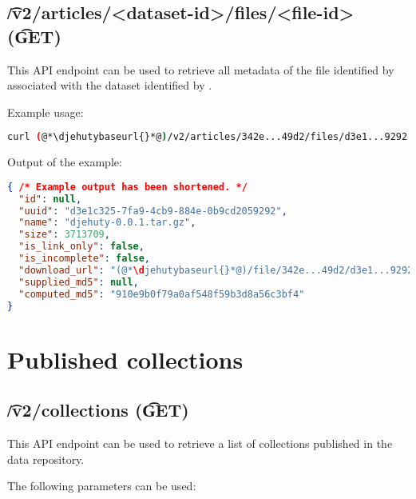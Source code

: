 \subsection{\t{/v2/articles/<dataset-id>/files/<file-id>} (\t{GET})}

  This API endpoint can be used to retrieve all metadata of the file
  identified by  associated with the dataset identified
  by .

  Example usage:
\begin{lstlisting}[language=bash]
curl (@*\djehutybaseurl{}*@)/v2/articles/342e...49d2/files/d3e1...9292 | jq
\end{lstlisting}

  Output of the example:
\begin{lstlisting}[language=JSON]
{ /* Example output has been shortened. */
  "id": null,
  "uuid": "d3e1c325-7fa9-4cb9-884e-0b9cd2059292",
  "name": "djehuty-0.0.1.tar.gz",
  "size": 3713709,
  "is_link_only": false,
  "is_incomplete": false,
  "download_url": "(@*\djehutybaseurl{}*@)/file/342e...49d2/d3e1...9292",
  "supplied_md5": null,
  "computed_md5": "910e9b0f79a0af548f59b3d8a56c3bf4"
}
\end{lstlisting}

\section{Published collections}

\subsection{\t{/v2/collections} (\t{GET})}
\label{sec:v2-collections}

  This API endpoint can be used to retrieve a list of collections published
  in the data repository.

  The following parameters can be used:

